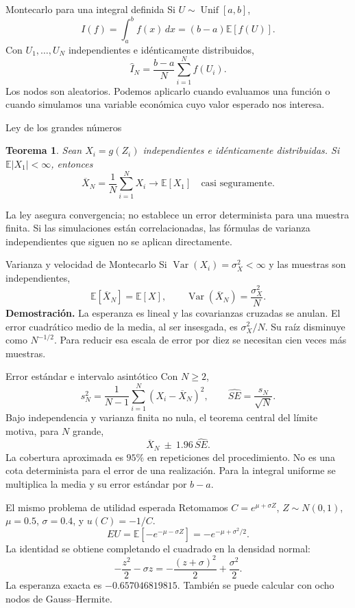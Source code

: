 \documentclass[aspectratio=169,12pt]{beamer}
\newtheorem{thm}{Teorema}
\begin{document}
\begin{frame}{Montecarlo para una integral definida}
Si $U\sim\operatorname{Unif}[a,b]$,
\[I(f)=\int_a^b f(x)\,dx=(b-a)\mathbb E[f(U)].\]
Con $U_1,\ldots,U_N$ independientes e idénticamente distribuidos,
\[\boxed{\widehat I_N=\frac{b-a}{N}\sum_{i=1}^N f(U_i).}\]
Los nodos son aleatorios. Podemos aplicarlo cuando evaluamos una función
o cuando simulamos una variable económica cuyo valor esperado nos interesa.
\end{frame}

\begin{frame}{Ley de los grandes números}
\begin{thm}
Sean $X_i=g(Z_i)$ independientes e idénticamente distribuidas.
Si $\mathbb E|X_1|<\infty$, entonces
\[\overline X_N=\frac1N\sum_{i=1}^N X_i\longrightarrow\mathbb E[X_1]
\quad\text{casi seguramente}.\]
\end{thm}
La ley asegura convergencia; no establece un error determinista para una muestra finita.
Si las simulaciones están correlacionadas, las fórmulas de varianza independientes
que siguen no se aplican directamente.
\end{frame}

\begin{frame}{Varianza y velocidad de Montecarlo}
Si $\operatorname{Var}(X_i)=\sigma_X^2<\infty$ y las muestras son independientes,
\[\mathbb E[\overline X_N]=\mathbb E[X],\qquad
\operatorname{Var}(\overline X_N)=\frac{\sigma_X^2}{N}.\]
\textbf{Demostración.} La esperanza es lineal y las covarianzas cruzadas se anulan.
El error cuadrático medio de la media, al ser insesgada, es $\sigma_X^2/N$.
Su raíz disminuye como $N^{-1/2}$.
Para reducir esa escala de error por diez se necesitan cien veces más muestras.
\end{frame}

\begin{frame}{Error estándar e intervalo asintótico}
Con $N\geq2$,
\[s_N^2=\frac1{N-1}\sum_{i=1}^N(X_i-\overline X_N)^2,\qquad
\widehat{SE}=\frac{s_N}{\sqrt N}.\]
Bajo independencia y varianza finita no nula, el teorema central del límite
motiva, para $N$ grande,
\[\overline X_N\ \pm\ 1.96\,\widehat{SE}.\]
La cobertura aproximada es $95\%$ en repeticiones del procedimiento.
No es una cota determinista para el error de una realización.
Para la integral uniforme se multiplica la media y su error estándar por $b-a$.
\end{frame}

\begin{frame}{El mismo problema de utilidad esperada}
Retomamos $C=e^{\mu+\sigma Z}$, $Z\sim N(0,1)$, $\mu=0.5$, $\sigma=0.4$,
y $u(C)=-1/C$.
\[EU=\mathbb E[-e^{-\mu-\sigma Z}]=-e^{-\mu+\sigma^2/2}.\]
La identidad se obtiene completando el cuadrado en la densidad normal:
\[-\frac{z^2}{2}-\sigma z=-\frac{(z+\sigma)^2}{2}+\frac{\sigma^2}{2}.\]
La esperanza exacta es $-0.657046819815$.
También se puede calcular con ocho nodos de Gauss--Hermite.
\end{frame}
\end{document}
